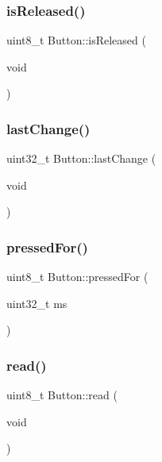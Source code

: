 \mbox{\label{class_button_a7bf938a70dee91015b044e434fc9499b}} 
\subsubsection{\texorpdfstring{is\+Released()}{isReleased()}}
{\footnotesize\ttfamily uint8\+\_\+t Button\+::is\+Released (\begin{DoxyParamCaption}\item[{void}]{ }\end{DoxyParamCaption})}

\mbox{\label{class_button_a6880ef962e03d55216d79217e7473bd2}} 
\subsubsection{\texorpdfstring{last\+Change()}{lastChange()}}
{\footnotesize\ttfamily uint32\+\_\+t Button\+::last\+Change (\begin{DoxyParamCaption}\item[{void}]{ }\end{DoxyParamCaption})}

\mbox{\label{class_button_a11b97b9e73881e876724ddeedac716f9}} 
\subsubsection{\texorpdfstring{pressed\+For()}{pressedFor()}}
{\footnotesize\ttfamily uint8\+\_\+t Button\+::pressed\+For (\begin{DoxyParamCaption}\item[{uint32\+\_\+t}]{ms }\end{DoxyParamCaption})}

\mbox{\label{class_button_a5f5c0d23ab0e5387b861e68019a7e85d}} 
\subsubsection{\texorpdfstring{read()}{read()}}
{\footnotesize\ttfamily uint8\+\_\+t Button\+::read (\begin{DoxyParamCaption}\item[{void}]{ }\end{DoxyParamCaption})}

